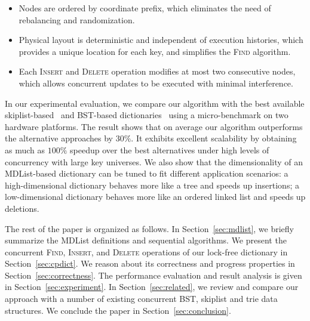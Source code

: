 \documentclass[10pt,conference,compsocconf]{IEEEtran}
\begin{document}
\begin{itemize}
    \item Nodes are ordered by coordinate prefix, which eliminates the need of rebalancing and randomization.
    \item Physical layout is deterministic and independent of execution histories, which provides a unique location for each key, and simplifies the \textsc{Find} algorithm.
    \item Each \textsc{Insert} and \textsc{Delete} operation modifies at most two consecutive nodes, which allows concurrent updates to be executed with minimal interference.
\end{itemize}

In our experimental evaluation, we compare our algorithm with the best available skiplist-based~\cite{dick2014logarithmic,fraser2004practical} and BST-based dictionaries~\cite{ellen2014amortized,arbel2014concurrent,bronson2010practical} using a micro-benchmark on two hardware platforms. 
The result shows that on average our algorithm outperforms the alternative approaches by $30\%$.
It exhibits excellent scalability by obtaining as much as $100\%$ speedup over the best alternatives under high levels of concurrency with large key universes.
We also show that the dimensionality of an MDList-based dictionary can be tuned to fit different application scenarios: a high-dimensional dictionary behaves more like a tree and speeds up insertions; a low-dimensional dictionary behaves more like an ordered linked list and speeds up deletions.

The rest of the paper is organized as follows. 
In Section~\ref{sec:mdlist}, we briefly summarize the MDList definitions and sequential algorithms.
We present the concurrent \textsc{Find}, \textsc{Insert}, and \textsc{Delete} operations of our lock-free dictionary in Section~\ref{sec:cpdict}.
We reason about its correctness and progress properties in Section~\ref{sec:correctness}.
The performance evaluation and result analysis is given in Section~\ref{sec:experiment}.
In Section~\ref{sec:related}, we review and compare our approach with a number of existing concurrent BST, skiplist and trie data structures.
We conclude the paper in Section~\ref{sec:conclusion}.
\end{document}
